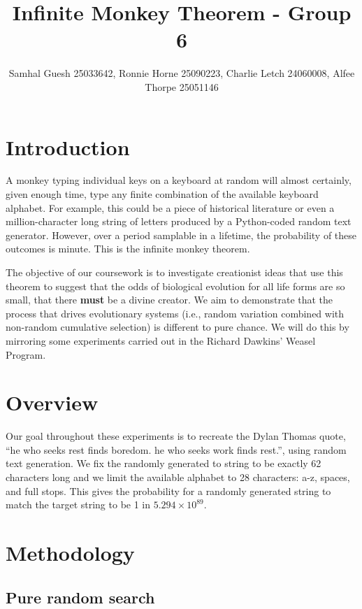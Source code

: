 \documentclass[10pt]{article}
\title{Infinite Monkey Theorem - Group 6}
\author{Samhal Guesh 25033642, Ronnie Horne 25090223, Charlie Letch 24060008, Alfee Thorpe 25051146}
\affil{
	MA2760: Mathematical Investigations with Python\\
	School of Mathematics, \\
	Cardiff University. 
}
\begin{document}
\maketitle


\section{Introduction}

A monkey typing individual keys on a keyboard at random will almost certainly, given enough time, type any finite combination of the available keyboard alphabet. For example, this could be a piece of historical literature or even a million-character long string of letters produced by a Python-coded random text generator. However, over a period samplable in a lifetime, the probability of these outcomes is minute. This is the infinite monkey theorem.

The objective of our coursework is to investigate creationist ideas that use this theorem to suggest that the odds of biological evolution for all life forms are so small, that there \textbf{must} be a divine creator.
We aim to demonstrate that the process that drives evolutionary systems (i.e., random variation combined with non-random cumulative selection) is different to pure chance. We will do this by mirroring some experiments carried out in the Richard Dawkins’ Weasel Program.

\section{Overview}

Our goal throughout these experiments is to recreate the Dylan Thomas quote, “he who seeks rest finds boredom. he who seeks work finds rest.”, using random text generation. We fix the randomly generated to string to be exactly 62 characters long and we limit the available alphabet to 28 characters: a-z, spaces, and full stops. This gives the probability for a randomly generated string to match the target string to be 1 in \(5.294 \times 10^{89}\).


\section{Methodology}

\subsection{Pure random search}
\end{document}
